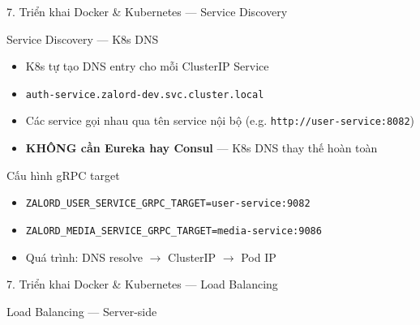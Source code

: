 \documentclass[aspectratio=169,compress]{beamer}
\begin{document}
\begin{frame}{7. Triển khai Docker \& Kubernetes --- Service Discovery}
\begin{block}{Service Discovery --- K8s DNS}
\begin{itemize}
  \item K8s tự tạo DNS entry cho mỗi ClusterIP Service
  \item \texttt{auth-service.zalord-dev.svc.cluster.local}
  \item Các service gọi nhau qua tên service nội bộ (e.g. \texttt{http://user-service:8082})
  \item \textbf{KHÔNG cần Eureka hay Consul} --- K8s DNS thay thế hoàn toàn
\end{itemize}
\end{block}

\begin{block}{Cấu hình gRPC target}
\begin{itemize}
  \item \texttt{ZALORD\_USER\_SERVICE\_GRPC\_TARGET=user-service:9082}
  \item \texttt{ZALORD\_MEDIA\_SERVICE\_GRPC\_TARGET=media-service:9086}
  \item Quá trình: DNS resolve $\rightarrow$ ClusterIP $\rightarrow$ Pod IP
\end{itemize}
\end{block}
\end{frame}

\begin{frame}{7. Triển khai Docker \& Kubernetes --- Load Balancing}
\begin{block}{Load Balancing --- Server-side}
\begin{center}
\end{center}
\end{block}

\end{frame}
\end{document}
